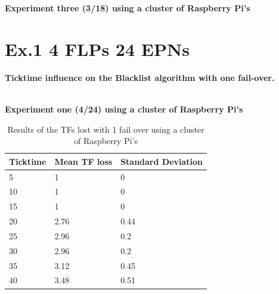 \begin{table}[h!]
\caption*{\textbf{Experiment three (3/18) using a cluster of Raspberry Pi's}}
\caption{Cumulative lost TFs by ticktime/EPN ratio with a random sample size for the Blacklist algorithm}
\label{table:Ex3318Results}
\end{table}

\newpage

\section{Ex.1 4 FLPs 24 EPNs}
\textbf{Ticktime influence on the Blacklist algorithm with one fail-over.}
\\~\\

\begin{table}[h!]
\caption*{\textbf{Experiment one (4/24) using a cluster of Raspberry Pi's}}
\begin{tabular}{| l | l | l |}
\hline
Ticktime & Mean TF loss & Standard Deviation \\ \hline
5 & 1 & 0 \\ \hline
10 & 1 & 0 \\ \hline
15 & 1 & 0 \\ \hline
20 & 2.76 & 0.44 \\ \hline
25 & 2.96 & 0.2 \\ \hline
30 & 2.96 & 0.2 \\ \hline
35 & 3.12 & 0.45 \\ \hline
40 & 3.48 & 0.51 \\ \hline
\end{tabular}
\caption{Results of the TFs lost with 1 fail over using a cluster of Raspberry Pi's}
\label{table:Ex1424Results}
\end{table}

